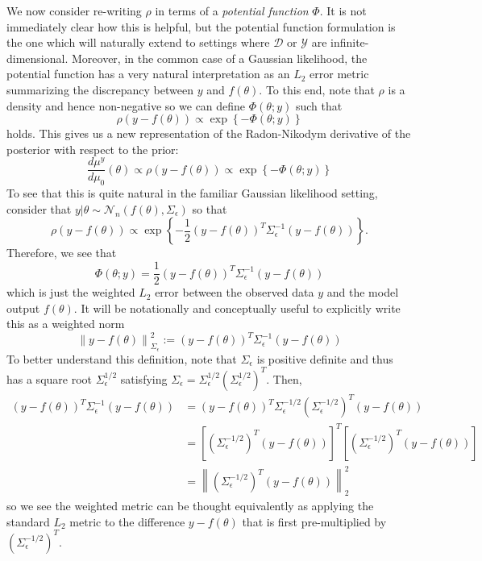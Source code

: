 \documentclass[12pt]{article}
\newcommand*{\norm}[1]{\left\lVert#1\right\rVert}
\begin{document}
We now consider re-writing $\rho$ in terms of a \textit{potential function} $\Phi$. It is not immediately clear how this is helpful, but the potential function formulation is the one which will naturally extend to settings
where $\mathcal{D}$ or $\mathcal{Y}$ are infinite-dimensional. Moreover, in the common case of a Gaussian likelihood, the potential function has a very natural interpretation as an $L_2$ error metric summarizing 
the discrepancy between $y$ and $f(\theta)$. To this end, note that $\rho$ is a density and hence non-negative so we can define $\Phi(\theta; y)$ such that
\[\rho(y - f(\theta)) \propto \exp\left\{-\Phi(\theta; y)\right\}\]
holds. This gives us a new representation of the Radon-Nikodym derivative of the posterior with respect to the prior:
\[\frac{d\mu^y}{d\mu_0}(\theta) \propto \rho(y - f(\theta)) \propto \exp\left\{-\Phi(\theta; y)\right\}\]
To see that this is quite natural in the familiar Gaussian likelihood setting, consider that $y|\theta \sim \mathcal{N}_n(f(\theta), \Sigma_\epsilon)$ so that 
\[\rho(y - f(\theta)) \propto  \exp\left\{-\frac{1}{2}(y - f(\theta))^T \Sigma_\epsilon^{-1}(y - f(\theta))\right\}.\]
Therefore, we see that 
\[\Phi(\theta; y) = \frac{1}{2}(y - f(\theta))^T \Sigma_\epsilon^{-1}(y - f(\theta))\]
which is just the weighted $L_2$ error between the observed data $y$ and the model output $f(\theta)$. It will be notationally and conceptually useful to explicitly write this as a weighted norm 
\[\norm{y - f(\theta)}^2_{\Sigma_{\epsilon}} := (y - f(\theta))^T \Sigma_\epsilon^{-1}(y - f(\theta))\]
To better understand this definition, note that $\Sigma_\epsilon$ is positive definite and thus has a square root $\Sigma_\epsilon^{1/2}$ satisfying $\Sigma_\epsilon = \Sigma_\epsilon^{1/2} \left(\Sigma_\epsilon^{1/2}\right)^T$. Then, 
\begin{align*}
(y - f(\theta))^T \Sigma_\epsilon^{-1}(y - f(\theta)) &= (y - f(\theta))^T \Sigma_\epsilon^{-1/2} \left(\Sigma_\epsilon^{-1/2}\right)^T(y - f(\theta)) \\
									   &= \left[\left(\Sigma_\epsilon^{-1/2}\right)^T (y - f(\theta)) \right]^T \left[\left(\Sigma_\epsilon^{-1/2}\right)^T (y - f(\theta)) \right] \\
									   &= \norm{\left(\Sigma_\epsilon^{-1/2}\right)^T (y - f(\theta))}_2^2
\end{align*}
so we see the weighted metric can be thought equivalently as applying the standard $L_2$ metric to the difference $y - f(\theta)$ that is first pre-multiplied by $\left(\Sigma_\epsilon^{-1/2}\right)^T$. 
\end{document}
